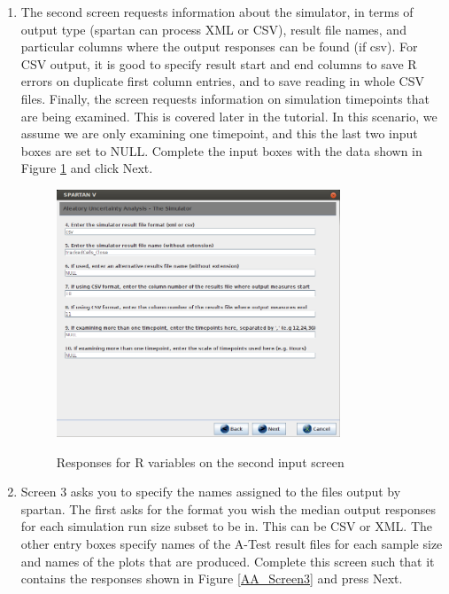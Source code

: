 \documentclass[a4paper,11pt]{article}
\begin{document}
\begin{enumerate}
\item The second screen requests information about the simulator, in terms of output type (spartan can process XML or CSV), result file names, and particular columns where the output responses can be found (if csv). For CSV output, it is good to specify result start and end columns to save R errors on duplicate first column entries, and to save reading in whole CSV files. Finally, the screen requests information on simulation timepoints that are being examined. This is covered later in the tutorial. In this scenario, we assume we are only examining one timepoint, and this the last two input boxes are set to NULL. Complete the input boxes with the data shown in Figure \ref{AA_Screen2} and click Next.

\begin{figure}
\centering
    \includegraphics[width=0.8\textwidth]{SpartanV_AA2.png}\\ \noindent
    \caption{Responses for R variables on the second input screen}
    \label{AA_Screen2}
    \newpage 
\end{figure}

\item Screen 3 asks you to specify the names assigned to the files output by spartan. The first asks for the format you wish the median output responses for each simulation run size subset to be in. This can be CSV or XML. The other entry boxes specify names of the A-Test result files for each sample size and names of the plots that are produced. Complete this screen such that it contains the responses shown in Figure \ref{AA_Screen3} and press Next.


\end{enumerate}
\end{document}
